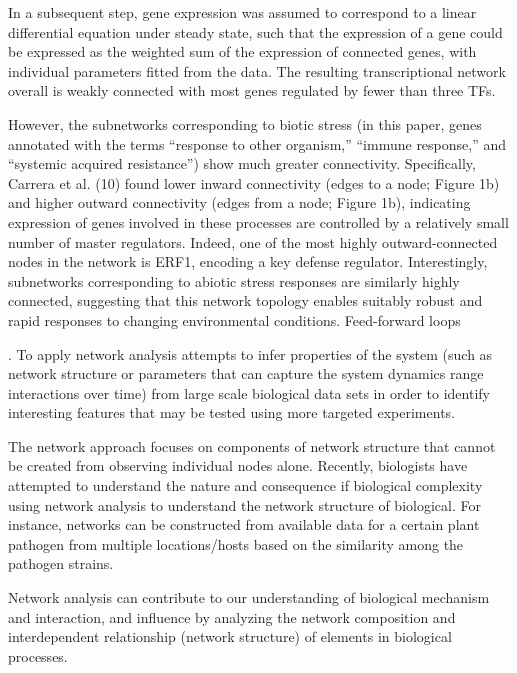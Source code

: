 In a subsequent step, gene expression was assumed to correspond to a linear differential equation under steady state, such that the expression of a gene could be expressed as the weighted sum of the expression of connected genes, with individual parameters fitted from the data. The resulting transcriptional network overall is weakly connected with most genes regulated by fewer than three TFs. 


However, the subnetworks corresponding to biotic stress (in this paper, genes annotated with the terms “response to other organism,” “immune response,” and “systemic acquired resistance”) show much greater connectivity. Specifically, Carrera et al. (10) found lower inward connectivity (edges to a node; Figure 1b) and higher outward connectivity (edges from a node; Figure 1b), indicating expression of genes involved in these processes are controlled by a relatively small number of master regulators. Indeed, one of the most highly outward-connected nodes in the network is ERF1, encoding a key defense regulator. Interestingly, subnetworks corresponding to abiotic stress responses are similarly highly connected, suggesting that this network topology enables suitably robust and rapid responses to changing environmental conditions. Feed-forward loops


. To apply network analysis attempts to infer properties of the system (such as network structure or parameters that can capture the system dynamics range interactions over time) from large scale biological data sets in order to identify interesting features that may be tested using more targeted experiments. 

The network approach focuses on components of network structure that cannot be created from observing individual nodes alone. Recently, biologists have attempted to understand the nature and consequence if biological complexity using network analysis to understand the network structure of biological. For instance, networks can be constructed from available data for a certain plant pathogen from multiple locations/hosts based on the similarity among the pathogen strains.

Network analysis can contribute to our understanding of biological mechanism and interaction, and influence by analyzing the network composition and interdependent relationship (network structure) of elements in biological processes. 

